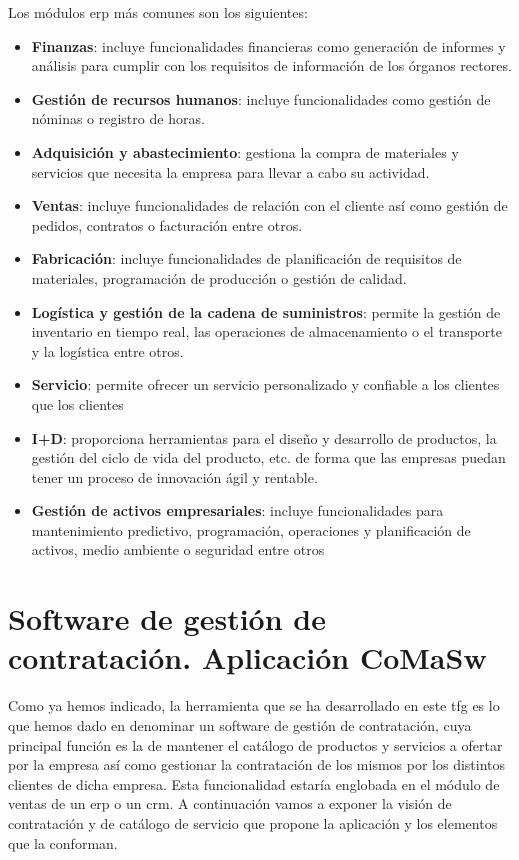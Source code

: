 Los módulos \acrshort{erp} más comunes son los siguientes\cite{SapERP}:
\begin{itemize}
\item \textbf{Finanzas}: incluye funcionalidades financieras como generación de informes y análisis para cumplir con los requisitos de información de los órganos rectores.
\item \textbf{Gestión de recursos humanos}: incluye funcionalidades como gestión de nóminas o registro de horas.
\item \textbf{Adquisición y abastecimiento}: gestiona la compra de materiales y servicios que necesita la empresa para llevar a cabo su actividad.
\item \textbf{Ventas}: incluye funcionalidades de relación con el cliente así como gestión de pedidos, contratos o facturación entre otros.
\item \textbf{Fabricación}: incluye funcionalidades de planificación de requisitos de materiales, programación de producción o gestión de calidad.
\item \textbf{Logística y gestión de la cadena de suministros}: permite la gestión de inventario en tiempo real, las operaciones de almacenamiento o el transporte y la logística entre otros.
\item \textbf{Servicio}: permite ofrecer un servicio personalizado y confiable a los clientes que los clientes
\item \textbf{I+D}: proporciona herramientas para el diseño y desarrollo de productos, la gestión del ciclo de vida del producto, etc. de forma que las empresas puedan tener un proceso de innovación ágil y rentable.
\item \textbf{Gestión de activos empresariales}: incluye funcionalidades para mantenimiento predictivo, programación, operaciones y planificación de activos, medio ambiente o seguridad entre otros
\end{itemize}


\section{Software de gestión de contratación. Aplicación CoMaSw}

Como ya hemos indicado, la herramienta que se ha desarrollado en este \acrshort{tfg} es lo que hemos dado en denominar un software de gestión de contratación, cuya principal función es la de mantener el catálogo de productos y servicios a ofertar por la empresa así como gestionar la contratación de los mismos por los distintos clientes de dicha empresa. Esta funcionalidad estaría englobada en el módulo de ventas de un \acrshort{erp} o un \acrshort{crm}. A continuación vamos a exponer la visión de contratación  y de catálogo de servicio que propone la aplicación y los elementos que la conforman.

